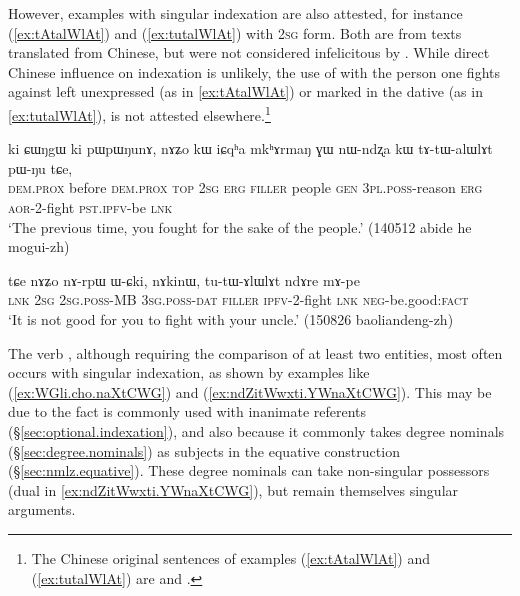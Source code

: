 However, examples with singular indexation are also attested, for instance (\ref{ex:tAtalWlAt}) and (\ref{ex:tutalWlAt}) with \textsc{2sg} form. Both are from texts translated from Chinese, but were not considered infelicitous by . While direct Chinese influence on indexation is unlikely, the use of  with the person one fights against left unexpressed (as in \ref{ex:tAtalWlAt}) or marked in the dative (as in \ref{ex:tutalWlAt}), is not attested elsewhere.\footnote{The Chinese original sentences of examples (\ref{ex:tAtalWlAt}) and (\ref{ex:tutalWlAt}) are  and .  } 

\begin{exe}
\ex   \label{ex:tAtalWlAt}
 \gll  ki ɕɯŋgɯ ki pɯpɯŋunɤ, nɤʑo kɯ iɕqʰa mkʰɤrmaŋ ɣɯ nɯ-ndʐa kɯ tɤ-tɯ-alɯlɤt pɯ-ŋu tɕe, \\
 \textsc{dem}.\textsc{prox} before \textsc{dem}.\textsc{prox} \textsc{top} \textsc{2sg} \textsc{erg} \textsc{filler} people \textsc{gen} \textsc{3pl}.\textsc{poss}-reason \textsc{erg} \textsc{aor}-2-fight \textsc{pst}.\textsc{ipfv}-be \textsc{lnk} \\
\glt `The previous time, you fought for the sake of the people.' (140512 abide he mogui-zh)
 \end{exe}

\begin{exe}
\ex   \label{ex:tutalWlAt}
 \gll  tɕe nɤʑo nɤ-rpɯ ɯ-ɕki, nɤkinɯ, tu-tɯ-ɤlɯlɤt ndɤre mɤ-pe \\
 \textsc{lnk} \textsc{2sg} \textsc{2sg}.\textsc{poss}-MB \textsc{3sg}.\textsc{poss}-\textsc{dat} \textsc{filler} \textsc{ipfv}-2-fight \textsc{lnk} \textsc{neg}-be.good:\textsc{fact} \\
 \glt `It is not good for you to fight with your uncle.' (150826 baoliandeng-zh)
  \end{exe}
  
The verb , although requiring the comparison of at least two entities, most often occurs with singular indexation, as shown by examples like (\ref{ex:WGli.cho.naXtCWG}) and (\ref{ex:ndZitWwxti.YWnaXtCWG}). This may be due to the fact  is commonly used with inanimate referents (§\ref{sec:optional.indexation}), and also because it commonly takes degree nominals  (§\ref{sec:degree.nominals}) as subjects in the equative construction (§\ref{sec:nmlz.equative}). These degree nominals can take non-singular possessors (dual in \ref{ex:ndZitWwxti.YWnaXtCWG}), but remain themselves singular arguments.

